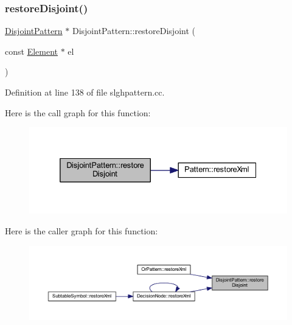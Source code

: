 \subsubsection{\texorpdfstring{restoreDisjoint()}{restoreDisjoint()}}
{\footnotesize\ttfamily \mbox{\hyperlink{class_disjoint_pattern}{Disjoint\+Pattern}} $\ast$ Disjoint\+Pattern\+::restore\+Disjoint (\begin{DoxyParamCaption}\item[{const \mbox{\hyperlink{class_element}{Element}} $\ast$}]{el }\end{DoxyParamCaption})\hspace{0.3cm}{\ttfamily [static]}}



Definition at line 138 of file slghpattern.\+cc.

Here is the call graph for this function\+:
\nopagebreak
\begin{figure}[H]
\begin{center}
\leavevmode
\includegraphics[width=332pt]{class_disjoint_pattern_aa9478beedbed7edf2dce73b2e8f0400d_cgraph}
\end{center}
\end{figure}
Here is the caller graph for this function\+:
\nopagebreak
\begin{figure}[H]
\begin{center}
\leavevmode
\includegraphics[width=350pt]{class_disjoint_pattern_aa9478beedbed7edf2dce73b2e8f0400d_icgraph}
\end{center}
\end{figure}
\mbox{\label{class_disjoint_pattern_a02be45ccd4e176e0ec68fc95a622e820}} 
